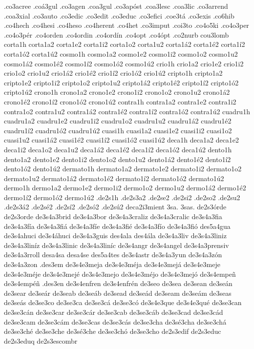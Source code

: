 {.co3acree
.coá3gul
.co3agen
.coa3gul
.co3apóst
.coa3lesc
.coa3lic
.co3arrend
.coa3xial
.co3auto
.co3edic
.co3edit
.co3educ
.co3efici
.coe3tá
.co3exis
.co6hib
.co4hech
.co4hesi
.co4heso
.co4herent
.co4het
.co3imput
.coi3to
.co4o5ki
.co4o3per
.co4o3pér
.co4orden
.co4ordin
.co4ordín
.co4opt
.co4ópt
.co2nurb
cou3lomb
corta1h
corta1a2 corta1e2 corta1i2 corta1o2 corta1u2
corta1á2 corta1é2 corta1í2 corta1ó2 corta1ú2
cosmo1h
cosmo1a2 cosmo1e2 cosmo1i2 cosmo1o2 cosmo1u2
cosmo1á2 cosmo1é2 cosmo1í2 cosmo1ó2 cosmo1ú2
crio1h
crio1a2 crio1e2 crio1i2 crio1o2 crio1u2
crio1á2 crio1é2 crio1í2 crio1ó2 crio1ú2
cripto1h
cripto1a2 cripto1e2 cripto1i2 cripto1o2 cripto1u2
cripto1á2 cripto1é2 cripto1í2 cripto1ó2 cripto1ú2
crono1h
crono1a2 crono1e2 crono1i2 crono1o2 crono1u2
crono1á2 crono1é2 crono1í2 crono1ó2 crono1ú2
contra1h
contra1a2 contra1e2 contra1i2 contra1o2 contra1u2
contra1á2 contra1é2 contra1í2 contra1ó2 contra1ú2
cuadru1h
cuadru1a2 cuadru1e2 cuadru1i2 cuadru1o2 cuadru1u2
cuadru1á2 cuadru1é2 cuadru1í2 cuadru1ó2 cuadru1ú2
cuasi1h
cuasi1a2 cuasi1e2 cuasi1i2 cuasi1o2 cuasi1u2
cuasi1á2 cuasi1é2 cuasi1í2 cuasi1ó2 cuasi1ú2
deca1h
deca1a2 deca1e2 deca1i2 deca1o2 deca1u2
deca1á2 deca1é2 deca1í2 deca1ó2 deca1ú2
dento1h
dento1a2 dento1e2 dento1i2 dento1o2 dento1u2
dento1á2 dento1é2 dento1í2 dento1ó2 dento1ú2
dermato1h
dermato1a2 dermato1e2 dermato1i2 dermato1o2 dermato1u2
dermato1á2 dermato1é2 dermato1í2 dermato1ó2 dermato1ú2
dermo1h
dermo1a2 dermo1e2 dermo1i2 dermo1o2 dermo1u2
dermo1á2 dermo1é2 dermo1í2 dermo1ó2 dermo1ú2
.de2s1h
.de2s3a2
.de2se2
.de2si2
.de2so2
.de2su2
.de2s3á2
.de2sé2
.de2sí2
.de2só2
.de2sú2
deca2i3mient
3sa.
3sas.
de2s3órde
de2s3orde
de3s4a3brid
de3s4a3bor
de3s4a3craliz
de3s4a3cralic
de3s4a3fia
de3s4a3fía
de3s4a3fiá
de3s4a3fíe
de3s4a3fié
de3s4a3fío
de3s4a3fió
des5a4gua
de3s4ahuci
de3s4áhuci
de3s4a3guis
des4ala
des4ála
de3s4a3liv
de3s4a3liniz
de3s4a3liníz
de3s4a3linic
de3s4a3liníc
de3s4angr
de3s4angel
de3s4a3prensiv
de3s4a3rroll
desa4sa
desa4se
des5a4tes
de3s4astr
de3s4a3yun
de3s4a3zón
de3s4a3zon
.des3em
de3s4e3meja
de3s4e3méja
de3s4e3mejá
de3s4e3meje
de3s4e3méje
de3s4e3mejé
de3s4e3mejo
de3s4e3méjo
de3s4e3mejó
de3s4empeñ
de3s4empéñ
.des3en
de3s4enfren
de3s4enfrén
de3seo
de3sea
de3sean
de3seán
de3sear
de3seár
de3seab
de3seáb
de3sead
de3seád
de3seam
de3seám
de3seas
de3seás
de3se3co
de3se3ca
de3se3cá
de3se3có
de3s4e3que
de3s4e3qué
de3se3can
de3se3cán
de3se3car
de3se3cár
de3se3cab
de3se3cáb
de3se3cad
de3se3cád
de3se3cam
de3se3cám
de3se3cas
de3se3cás
de3se3cha
de3sé3cha
de3se3chá
de3se3ché
de3se3che
de3sé3che
de3se3chó
de3se3cho
de2s3edif
de2s3educ
de2s3eduq
de2s3escombr
}
